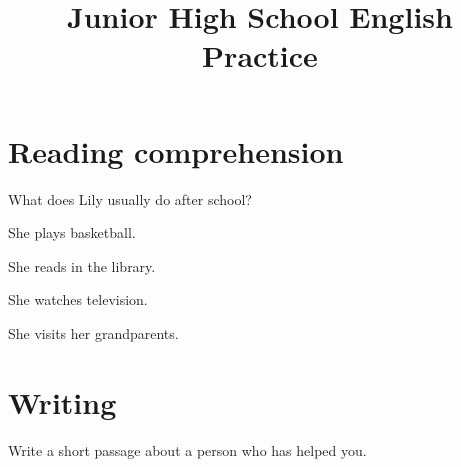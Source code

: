 \documentclass{exam-zh}
\begin{document}
\title{Junior High School English Practice}
\subject{English}
\maketitle

\section{Reading comprehension}

\begin{question}
  What does Lily usually do after school? \paren[B]
  \begin{choices}
    \item She plays basketball.
    \item She reads in the library.
    \item She watches television.
    \item She visits her grandparents.
  \end{choices}
\end{question}

\section{Writing}

Write a short passage about a person who has helped you.

\begin{writingbox}[title = {A Person Who Helped Me}]
  \vspace*{10em}
\end{writingbox}
\end{document}
